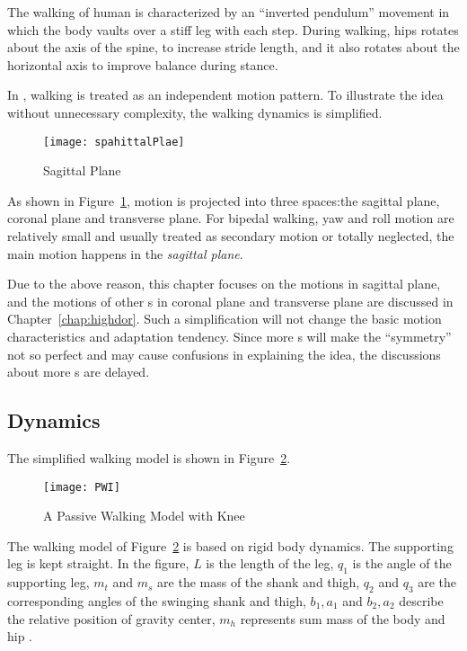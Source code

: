 The walking of human is characterized by an ``inverted pendulum'' movement in which the body vaults over a stiff leg with each step.
During walking, hips rotates about the axis of the spine, to increase stride length, and it also rotates about the horizontal axis to improve balance during stance.


In \moit, walking is treated as an independent motion pattern.
To illustrate the idea without unnecessary complexity, the walking dynamics is simplified.


\begin{figure}[!htbp]
  \begin{center}
    \texttt{[image: spahittalPlae]}
    \caption{Sagittal Plane}
    \label{fig:sgplane}
\end{center}
\end{figure}

As shown in Figure~\ref{fig:sgplane}, motion is projected into three spaces:the sagittal plane, coronal plane and transverse plane.
For bipedal walking,
 yaw and roll motion are relatively small and usually treated as secondary motion or totally neglected,  the main motion happens in the \emph{sagittal plane}.




Due to the above reason, this chapter focuses on the motions in sagittal plane, and  the motions of other \dof s in coronal plane and transverse plane are discussed in Chapter~\ref{chap:highdor}.
Such a simplification will not change the basic motion characteristics and adaptation tendency.
Since more {\dof}s will make the ``symmetry'' not so perfect and may cause confusions in explaining the idea, the discussions about more {\dof}s are delayed.



\subsection*{Dynamics}

The simplified walking model is shown in Figure~\ref{fig:passivekneewalker}.

\begin{figure}[!htbp]
  \begin{center}
    \texttt{[image: PWI]}
    \caption{A Passive Walking Model with Knee}
    \label{fig:passivekneewalker}
  \end{center}
\end{figure}
The walking model of Figure~\ref{fig:passivekneewalker} is based on rigid body dynamics.
The supporting leg is kept straight.
In the figure, $L$ is the length of the leg, $q_1$ is the angle of the supporting leg,
$m_t$ and $m_s$ are the mass of the shank and thigh,
$q_2$ and $q_3$ are the corresponding angles of the swinging shank and thigh,
$b_1,a_1$ and $b_2,a_2$ describe the relative position of gravity center,
$m_h$ represents sum mass of the body and hip .






